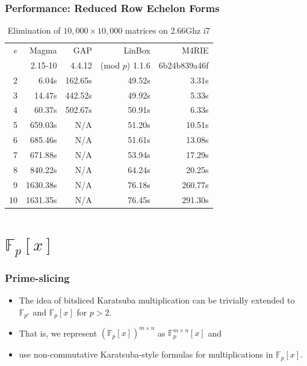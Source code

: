 \documentclass[11pt]{beamer}
\newcommand{\field}[1]{\mathbb{#1}}
\newcommand{\F}{\ensuremath{\field{F}}\xspace}
\begin{document}
\begin{frame}
\frametitle{Performance: Reduced Row Echelon Forms}
\begin{table}[ht]
\begin{small}
\begin{center}
\begin{tabular}{|r|r|r|r|r|}
\hline
 $e$ & Magma & GAP & LinBox & M4RIE \\
     & {\footnotesize 2.15-10} & {\footnotesize 4.4.12} & (mod $p$) 1.1.6 & {\footnotesize 6b24b839a46f}\\
\hline
  2 &    6.04s &  162.65s & 49.52s &   3.31s\\
  3 &   14.47s &  442.52s & 49.92s &   5.33s\\
  4 &   60.37s &  502.67s & 50.91s &   6.33s\\
  5 &  659.03s &      N/A & 51.20s &  10.51s\\
  6 &  685.46s &      N/A & 51.61s &  13.08s\\
  7 &  671.88s &      N/A & 53.94s &  17.29s\\
  8 &  840.22s &      N/A & 64.24s &  20.25s\\
\hline
  9 & 1630.38s &      N/A & 76.18s & 260.77s\\
 10 & 1631.35s &      N/A & 76.45s & 291.30s\\
\hline
\end{tabular}
\end{center}
\end{small}
\caption{Elimination of $10,000 \times 10,000$ matrices on 2.66Ghz i7}
\label{tab:echelonform}
\end{table}
\end{frame}

\section{\texorpdfstring{$\F_p[x]$}{Fp[x]}}

\begin{frame}
\frametitle{Prime-slicing}
\begin{itemize}
 \item The idea of bitsliced Karatsuba multiplication can be trivially extended to $\F_{p^e}$ and $\F_p[x]$ for $p>2$.
 \item That is, we represent $(\F_p[x])^{m \times n}$ as $\F_p^{m \times n}[x]$ and
 \item use non-commutative Karatsuba-style formulas for multiplications in $\F_p[x]$.
\end{itemize}
\end{frame}
\end{document}
